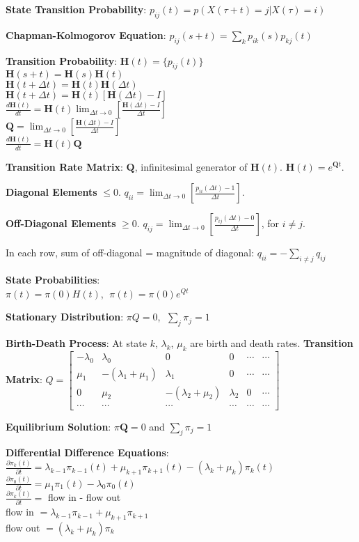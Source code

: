 \documentclass{scrartcl}
\begin{document}
\begin{multicols*}{3}
{\bf State Transition Probability}: $p_{ij}(t) = p(X(\tau+t)=j|X(\tau)=i)$

{\bf Chapman-Kolmogorov Equation}: $p_{ij}(s+t) = \sum_kp_{ik}(s)p_{kj}(t)$

{\bf Transition Probability}:
$\bm{H}(t) = \{p_{ij}(t)\}$ \\
$\bm{H}(s+t) = \bm{H}(s)\bm{H}(t)$ \\
$\bm{H}(t+\Delta t) = \bm{H}(t)\bm{H}(\Delta t)$ \\
$\bm{H}(t+\Delta t) = \bm{H}(t)[\bm{H}(\Delta t)-I]$ \\
$\frac{d\bm{H}(t)}{dt} = \bm{H}(t)\lim_{\Delta t\to 0}[\frac{\bm{H}(\Delta t) - I}{\Delta t}]$ \\
$\bm{Q} = \lim_{\Delta t\to 0}[\frac{\bm{H}(\Delta t)-I}{\Delta t}]$ \\
$\frac{d\bm{H}(t)}{dt} = \bm{H}(t)\bm{Q}$

{\bf Transition Rate Matrix}: $\bm{Q}$, infinitesimal generator of $\bm{H}(t)$. $\bm{H}(t)=e^{\bm{Q}t}$.

{\bf Diagonal Elements} $\leq 0$. $q_{ii}=\lim_{\Delta t\to 0}[\frac{p_{ii}(\Delta t)-1}{\Delta t}]$.

{\bf Off-Diagonal Elements} $\geq 0$. $q_{ij}=\lim_{\Delta t\to 0}[\frac{p_{ij}(\Delta t)-0}{\Delta t}]$, for $i\neq j$.

In each row, sum of off-diagonal = magnitude of diagonal: $q_{ii}=-\sum_{i\neq j}q_{ij}$

{\bf State Probabilities}:\\ $\pi(t)=\pi(0)H(t)$, $\;\pi(t)=\pi(0)e^{Qt}$

{\bf Stationary Distribution}: $\pi Q=0$, $\;\sum_j\pi_j=1$


{\bf Birth-Death Process}: At state $k$, $\lambda_k$, $\mu_k$ are birth and death rates. {\bf Transition Matrix}: $Q=\begin{bmatrix}
-\lambda_0 & \lambda_0 & 0 & 0 & \cdots & \cdots \\
\mu_1 & -(\lambda_1+\mu_1) & \lambda_1 & 0 & \cdots & \cdots \\
0 & \mu_2 & -(\lambda_2+\mu_2) & \lambda_2 & 0 & \cdots \\
\cdots & \cdots & \cdots & \cdots & \cdots & \cdots
\end{bmatrix}$

{\bf Equilibrium Solution}: $\pi\bm{Q}=0$ and $\sum_j\pi_j=1$

{\bf Differential Difference Equations}: $\frac{\partial\pi_k(t)}{\partial t} = \lambda_{k-1}\pi_{k-1}(t)+\mu_{k+1}\pi_{k+1}(t)-(\lambda_k+\mu_k)\pi_k(t)$ \\
$\frac{\partial\pi_0(t)}{\partial t} = \mu_1\pi_1(t) - \lambda_0\pi_0(t)$ \\
$\frac{\partial\pi_k(t)}{\partial t} = $ flow in - flow out \\
flow in $=\lambda_{k-1}\pi_{k-1}+\mu_{k+1}\pi_{k+1}$ \\
flow out $= (\lambda_k+\mu_k)\pi_k$




\end{multicols*}
\end{document}
